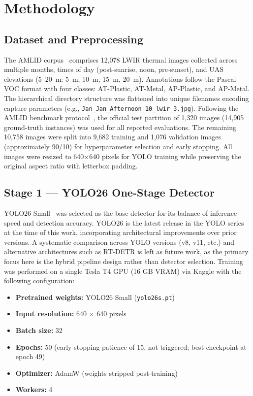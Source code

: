 \documentclass[conference]{IEEEtran}
\begin{document}
\section{Methodology}

\subsection{Dataset and Preprocessing}

The AMLID corpus~\cite{gallagher2025} comprises 12,078 LWIR thermal images collected across multiple months, times of day (post-sunrise, noon, pre-sunset), and UAS elevations (5--20~m: 5~m, 10~m, 15~m, 20~m). Annotations follow the Pascal VOC format with four classes: AT-Plastic, AT-Metal, AP-Plastic, and AP-Metal. The hierarchical directory structure was flattened into unique filenames encoding capture parameters (e.g., {\tt Jan\_Jan\_Afternoon\_10\_lwir\_3.jpg}). Following the AMLID benchmark protocol~\cite{gallagher2025}, the official test partition of 1,320 images (14,905 ground-truth instances) was used for all reported evaluations. The remaining 10,758 images were split into 9,682 training and 1,076 validation images (approximately 90/10) for hyperparameter selection and early stopping. All images were resized to 640$\times$640 pixels for YOLO training while preserving the original aspect ratio with letterbox padding.

\subsection{Stage 1 --- YOLO26 One-Stage Detector}

YOLO26 Small~\cite{jocher2026yolo26} was selected as the base detector for its balance of inference speed and detection accuracy. YOLO26 is the latest release in the YOLO series at the time of this work, incorporating architectural improvements over prior versions. A systematic comparison across YOLO versions (v8, v11, etc.) and alternative architectures such as RT-DETR is left as future work, as the primary focus here is the hybrid pipeline design rather than detector selection. Training was performed on a single Tesla T4 GPU (16 GB VRAM) via Kaggle with the following configuration:

\begin{itemize}
  \item \textbf{Pretrained weights:} YOLO26 Small ({\tt yolo26s.pt})
  \item \textbf{Input resolution:} 640 $\times$ 640 pixels
  \item \textbf{Batch size:} 32
  \item \textbf{Epochs:} 50 (early stopping patience of 15, not triggered; best checkpoint at epoch 49)
  \item \textbf{Optimizer:} AdamW (weights stripped post-training)
  \item \textbf{Workers:} 4
\end{itemize}
\end{document}
